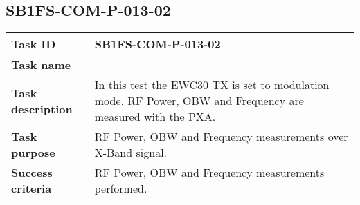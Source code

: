 \renewcommand{\procid}{SB1FS-COM-P-013}
\renewcommand{\subprocid}{\procid-02}
\renewcommand{\procname}{\TestPerfRFPXA}

\newpage
\subsection{\subprocid{} \procname{}}\label{sec:RFPXA}

\begin{table}[H]
	\centering
	\footnotesize
	\begin{tabular}{|L{3.0cm}|L{13.0cm}|}\hline
	 \textbf{Task ID} & \subprocid{} \\\hline
	 \textbf{Task name} & \procname \\\hline
	 \textbf{Task description} & In this test the EWC30 TX is set to 
	 modulation mode. RF Power, OBW and Frequency are measured with the PXA.\\ \hline
	 \textbf{Task purpose} & RF Power, OBW and Frequency measurements over X-Band signal.\\\hline
	 \textbf{Success criteria} & RF Power, OBW and Frequency measurements performed.\\\hline


\end{tabular}
\end{table}
